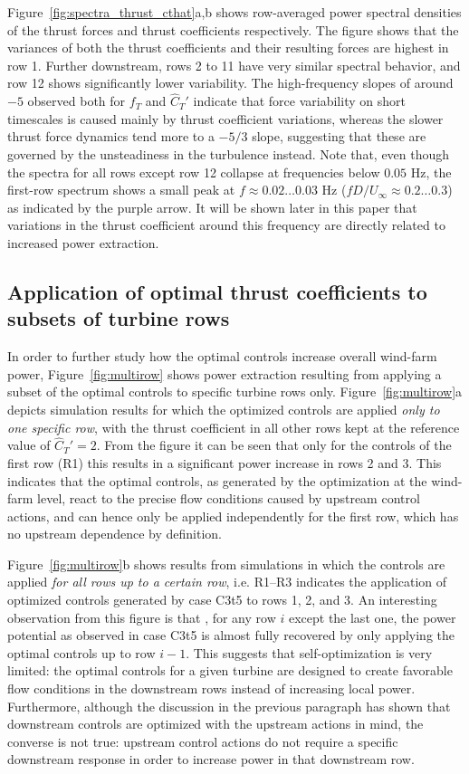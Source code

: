 \documentclass[wes, manuscript]{copernicus}
\newcommand{\cthat}{\widehat{C}_T'}
\begin{document}
Figure~\ref{fig:spectra_thrust_cthat}a,b shows row-averaged power spectral densities of the thrust forces and thrust coefficients respectively. The figure shows that the variances of both the thrust coefficients and their resulting forces are highest in row 1. Further downstream, rows 2 to 11 have very similar spectral behavior, and row 12 shows significantly lower variability. The high-frequency slopes of around $-5$ observed both for $f_T$ and $\cthat$ indicate that force variability on short timescales is caused mainly by thrust coefficient variations, whereas the slower thrust force dynamics tend more to a $-5/3$ slope, suggesting that these are governed by the unsteadiness in the turbulence instead. Note that, even though the spectra for all rows except row 12 collapse at frequencies below $0.05$ Hz, the first-row spectrum shows a small peak at $f \approx 0.02 \dots 0.03$ Hz ($f D / U_\infty \approx 0.2 \dots 0.3$) as indicated by the purple arrow. It will be shown later in this paper that variations in the thrust coefficient around this frequency are directly related to increased power extraction. 

\subsection{Application of optimal thrust coefficients to subsets of turbine rows}\label{sec:application_subset}

In order to further study how the optimal controls increase overall wind-farm power, Figure~\ref{fig:multirow} shows power extraction resulting from applying a subset of the optimal controls to specific turbine rows only. Figure~\ref{fig:multirow}a depicts simulation results for which the  optimized controls are applied \emph{only to one specific row}, with the thrust coefficient in all other rows kept at the reference value of $\cthat = 2$. From the figure it can be seen that only for the controls of the first row (R1) this results in a significant power increase in rows 2 and 3. This indicates that the optimal controls, as generated by the optimization at the wind-farm level, react to the precise flow conditions caused by upstream control actions, and can hence only be applied independently for the first row, which has no upstream dependence by definition. 

Figure~\ref{fig:multirow}b shows results from simulations in which the controls are applied \emph{for all rows up to a certain row}, i.e. R1--R3 indicates the application of optimized controls generated by case C3t5 to rows 1, 2, and 3. An interesting observation from this figure is that , for any row $i$ except the last one, the power potential as observed in case C3t5 is almost fully recovered by only applying the optimal controls up to row $i-1$. This suggests that self-optimization is very limited: the optimal controls for a given turbine are designed to create favorable flow conditions in the downstream rows instead of increasing local power. Furthermore, although the discussion in the previous paragraph has shown that downstream controls are optimized with the upstream actions in mind, the converse is not true: upstream control actions do not require a specific downstream response in order to increase power in that downstream row. 
\end{document}
